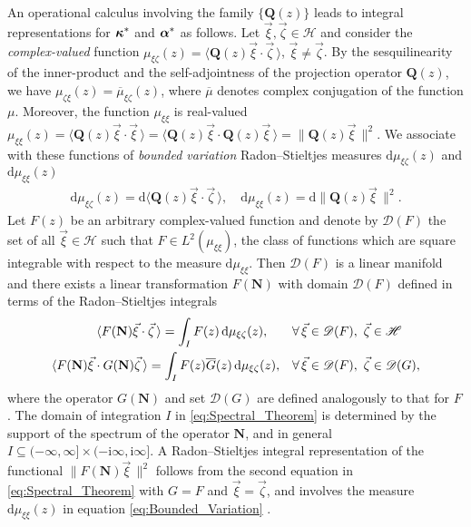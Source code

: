 \documentclass[11pt]{amsart}
\newcommand{\I}{\mathrm{i}}
\renewcommand{\d}{\mathrm{d}}
\newcommand{\Qb}{\mathbf{Q}}
\newcommand{\Nb}{\mathbf{N}}
\newcommand{\Hs}{\mathscr{H}}
\newcommand\balpha{\mbox{\boldmath${\alpha}$}}
\newcommand\bkappa{\mbox{\boldmath${\kappa}$}}
\begin{document}
An operational calculus involving the family $\{\Qb(z)\}$ leads to
integral representations for $\bkappa^*$ and $\balpha^*$ as
follows. Let $\vec{\xi},\vec{\zeta}\in\Hs$ and consider the
\emph{complex-valued} function $\mu_{\xi\zeta}(z)=\langle\Qb(z)\vec{\xi}\cdot\vec{\zeta}\,\rangle$, 
$\vec{\xi}\neq\vec{\zeta}$. By the sesquilinearity of the inner-product and the
self-adjointness of the projection operator $\Qb(z)$, we have
$\mu_{\zeta\xi}(z)=\overline{\mu}_{\xi\zeta}(z)$, where $\overline{\mu}$ denotes complex
conjugation of the function $\mu$. Moreover, the function $\mu_{\xi\xi}$ is
real-valued
$\mu_{\xi\xi}(z)=\langle\Qb(z)\vec{\xi}\cdot\vec{\xi}\,\rangle=\langle\Qb(z)\vec{\xi}\cdot\Qb(z)\vec{\xi}\,\rangle 
=\|\Qb(z)\vec{\xi}\,\|^2$. We associate with these functions of
\emph{bounded variation} Radon--Stieltjes measures $\d\mu_{\xi\zeta}(z)$ and
$\d\mu_{\xi\xi}(z)$ \cite{Stone:64}  
%
\begin{align}\label{eq:Bounded_Variation}
  \d\mu_{\xi\zeta}(z)=\d\langle\Qb(z)\vec{\xi}\cdot\vec{\zeta}\,\rangle, \quad
  \d\mu_{\xi\xi}(z)=\d\|\Qb(z)\vec{\xi}\,\|^2.
\end{align}
%
Let $F(z)$ be an arbitrary complex-valued function and denote by
$\mathscr{D}(F)$ the set of all $\vec{\xi}\in\Hs$ such that
$F\in L^2(\mu_{\xi\xi})$, the class of functions which are square integrable
with respect to the measure $\d\mu_{\xi\xi}$.
Then $\mathscr{D}(F)$ is a linear manifold and there exists a linear
transformation $F(\Nb)$ with domain $\mathscr{D}(F)$ defined in terms
of the Radon--Stieltjes integrals \cite{Stone:64} 
%
\begin{align}\label{eq:Spectral_Theorem}
  \langle F(\Nb)\vec{\xi}\cdot\vec{\zeta}\,\rangle=\int_IF(z)\,\d\mu_{\xi\zeta}(z), \qquad
  &\forall \, \vec{\xi}\in\mathscr{D}(F), \ \vec{\zeta}\in\Hs
  \\
  \langle F(\Nb)\vec{\xi}\cdot G(\Nb)\vec{\zeta}\,\rangle=\int_IF(z)\overline{G}(z)\,\d\mu_{\xi\zeta}(z),
  \quad
  &\forall \, \vec{\xi}\in\mathscr{D}(F), \ \vec{\zeta}\in\mathscr{D}(G),
  \notag
\end{align}
%
where the operator $G(\Nb)$ and set $\mathscr{D}(G)$ are defined
analogously to that for $F$. The domain of integration
$I$ in \eqref{eq:Spectral_Theorem} is determined by the support of the 
spectrum of the operator $\Nb$, and in general $I\subseteq(-\infty,\infty]\times(-\I\infty,\I\infty]$.
A Radon--Stieltjes integral representation of the functional
$\|F(\Nb)\vec{\xi}\,\|^2$ follows from the second equation in
\eqref{eq:Spectral_Theorem} with $G=F$ and $\vec{\xi}=\vec{\zeta}$, and
involves the measure $\d\mu_{\xi\xi}(z)$ in equation
\eqref{eq:Bounded_Variation} \cite{Stone:64}.  
\end{document}
